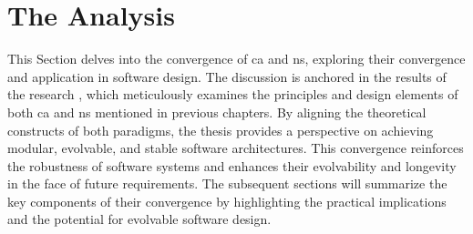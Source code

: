 \section{The Analysis}

This Section delves into the convergence of \gls{ca} and \gls{ns}, exploring their
convergence and application in software design. The discussion is anchored in the results
of the research   \cite{koks_convergence_2023}, which
meticulously examines the principles and design elements of both \gls{ca} and \gls{ns}
mentioned in previous chapters. By aligning the theoretical constructs of both paradigms,
the thesis provides a perspective on achieving modular, evolvable, and stable software
architectures. This convergence reinforces the robustness of software systems and enhances
their evolvability and longevity in the face of future requirements. The subsequent
sections will summarize the key components of their convergence by highlighting the
practical implications and the potential for evolvable software design.

 

%
%